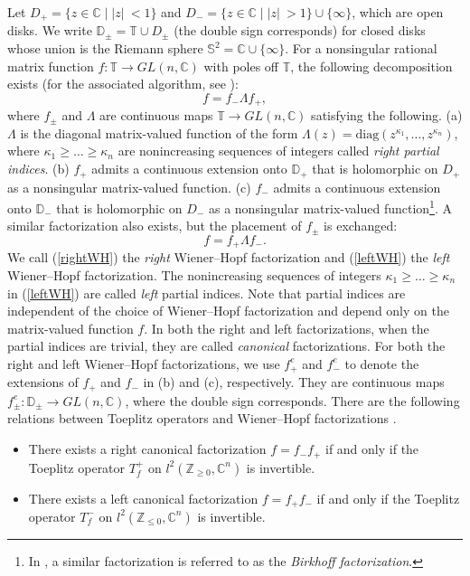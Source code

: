 \documentclass{amsart}
\theoremstyle{plain}
\theoremstyle{definition}
\theoremstyle{remark}
\newcommand{\Z}{\mathbb{Z}}
\newcommand{\C}{\mathbb{C}}
\newcommand{\T}{\mathbb{T}}
\newcommand{\D}{\mathbb{D}}
\newcommand{\SSS}{\mathbb{S}}
\newcommand{\diag}{\mathrm{diag}}
\begin{document}
Let $D_+ = \{ z \in \C \mid \lvert z \lvert \ < 1\}$ and $D_- = \{ z \in \C \mid \lvert z \lvert \ > 1 \} \cup \{ \infty\}$, which are open disks.
We write $\D_\pm = \T \cup D_\pm$ (the double sign corresponds) for closed disks whose union is the Riemann sphere $\SSS^2 = \C \cup \{ \infty \}$.
For a nonsingular rational matrix function $f \colon \T \to GL(n,\C)$ with poles off $\T$, the following decomposition exists (for the associated algorithm, see \cite{GKS03}):
\begin{equation}
\label{rightWH}
	f = f_- \Lambda f_+,
\end{equation}
where $f_\pm$ and $\Lambda$ are continuous maps $\T \to GL(n,\C)$ satisfying the following.
(a) $\Lambda$ is the diagonal matrix-valued function of the form $\Lambda(z) = \diag(z^{\kappa_1}, \ldots, z^{\kappa_n})$, where $\kappa_1 \geq \ldots \geq \kappa_n$ are nonincreasing sequences of integers called {\em right partial indices}.
(b) $f_+$ admits a continuous extension onto $\D_+$ that is holomorphic on $D_+$ as a nonsingular matrix-valued function.
(c) $f_-$ admits a continuous extension onto $\D_-$ that is holomorphic on $D_-$ as a nonsingular matrix-valued function\footnote{In \cite{PS86}, a similar factorization is referred to as the {\em Birkhoff factorization}.}.
A similar factorization also exists, but the placement of $f_\pm$ is exchanged:
\begin{equation}
\label{leftWH}
	f = f_+ \Lambda f_-.
\end{equation}
We call (\ref{rightWH}) the {\em right} Wiener--Hopf factorization and (\ref{leftWH}) the {\em left} Wiener--Hopf factorization.
The nonincreasing sequences of integers $\kappa_1 \geq \ldots \geq \kappa_n$ in (\ref{leftWH}) are called {\em left} partial indices.
Note that partial indices are independent of the choice of Wiener--Hopf factorization and depend only on the matrix-valued function $f$.
In both the right and left factorizations, when the partial indices are trivial, they are called {\em canonical} factorizations.
For both the right and left Wiener--Hopf factorizations, we use $f^e_+$ and $f^e_-$ to denote the extensions of $f_+$ and $f_-$ in (b) and (c), respectively.
They are continuous maps $f^e_\pm \colon \D_\pm \to GL(n,\C)$, where the double sign corresponds.
There are the following relations between Toeplitz operators and Wiener--Hopf factorizations \cite{CG81}.
\begin{itemize}
\item There exists a right canonical factorization $f = f_- f_+$ if and only if the Toeplitz operator $T^+_f$ on $l^2(\Z_{\geq 0}, \C^n)$ is invertible.
\item There exists a left canonical factorization $f = f_+ f_-$ if and only if the Toeplitz operator $T^-_f$ on $l^2(\Z_{\leq 0}, \C^n)$ is invertible.
\end{itemize}
\end{document}
